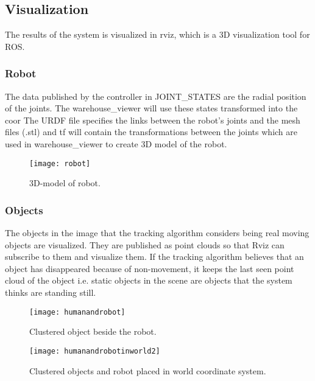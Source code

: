 \subsection{Visualization}

The results of the system is visualized in rviz, which is a 3D visualization tool for ROS. 

\subsubsection{Robot}
The data published by the controller in JOINT\_STATES are the radial position of the joints. The warehouse\_viewer will use these states transformed into the coor The URDF file specifies the links between the robot’s joints and the mesh files (.stl) and tf will contain the transformations between the joints which are used in warehouse\_viewer to create 3D model of the robot. 

\begin{figure}[H]
\begin{center}
\texttt{[image: robot]}
\caption{3D-model of robot.}

\end{center}
\end{figure}

\subsubsection{Objects}
The objects in the image that the tracking algorithm considers being real moving objects are visualized. They are published as point clouds so that Rviz can subscribe to them and visualize them. If the tracking algorithm believes that an object has disappeared because of non-movement, it keeps the last seen point cloud of the object i.e. static objects in the scene are objects that the system thinks are standing still. 

\begin{figure}[H]
\begin{center}
\texttt{[image: humanandrobot]}
\caption{Clustered object beside the robot.}

\end{center}
\end{figure}

\begin{figure}[H]
\begin{center}
\texttt{[image: humanandrobotinworld2]}
\caption{Clustered objects and robot placed in world coordinate system.}

\end{center}
\end{figure}  

